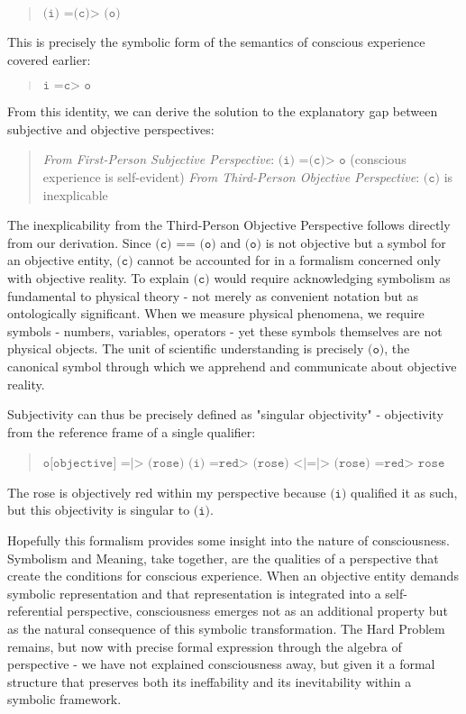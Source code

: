 \documentclass[runningheads]{llncs}
\begin{document}
\begin{quote}
$\texttt{(i) =(c)> (o)}$
\end{quote}

This is precisely the symbolic form of the semantics of conscious experience covered earlier:

\begin{quote}
$\texttt{i =c> o}$
\end{quote}

From this identity, we can derive the solution to the explanatory gap between subjective and objective perspectives:

\begin{quote}
\emph{From First-Person Subjective Perspective}: $\texttt{(i) =(c)> o}$ (conscious experience is self-evident)
\emph{From Third-Person Objective Perspective}: $\texttt{(c)}$ is inexplicable
\end{quote}

The inexplicability from the Third-Person Objective Perspective follows directly from our derivation. Since $\texttt{(c) == (o)}$ and $\texttt{(o)}$ is not objective but a symbol for an objective entity, $\texttt{(c)}$ cannot be accounted for in a formalism concerned only with objective reality. To explain $\texttt{(c)}$ would require acknowledging symbolism as fundamental to physical theory - not merely as convenient notation but as ontologically significant. When we measure physical phenomena, we require symbols - numbers, variables, operators - yet these symbols themselves are not physical objects. The unit of scientific understanding is precisely $\texttt{(o)}$, the canonical symbol through which we apprehend and communicate about objective reality.

Subjectivity can thus be precisely defined as "singular objectivity" - objectivity from the reference frame of a single qualifier:

\begin{quote}
$\texttt{o[objective] =|> (rose)}$
$\texttt{(i) =red> (rose) <|=|> (rose) =red> rose}$
\end{quote}

The rose is objectively red within my perspective because $\texttt{(i)}$ qualified it as such, but this objectivity is singular to $\texttt{(i)}$.

Hopefully this formalism provides some insight into the nature of consciousness. Symbolism and Meaning, take together, are the qualities of a perspective that create the conditions for conscious experience. When an objective entity demands symbolic representation and that representation is integrated into a self-referential perspective, consciousness emerges not as an additional property but as the natural consequence of this symbolic transformation. The Hard Problem remains, but now with precise formal expression through the algebra of perspective - we have not explained consciousness away, but given it a formal structure that preserves both its ineffability and its inevitability within a symbolic framework.
\end{document}
